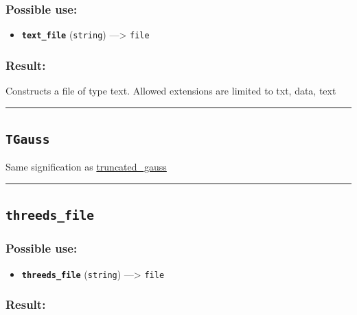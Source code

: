 \documentclass[]{book}
\providecommand{\tightlist}{%
  \setlength{\itemsep}{0pt}\setlength{\parskip}{0pt}}
\theoremstyle{definition}
\theoremstyle{definition}
\theoremstyle{definition}
\theoremstyle{remark}
\begin{document}
\subsubsection{Possible use:}\label{possible-use-517}

\begin{itemize}
\tightlist
\item
  \textbf{\texttt{text\_file}} (\texttt{string}) ---\textgreater{}
  \texttt{file}
\end{itemize}

\subsubsection{Result:}\label{result-500}

Constructs a file of type text. Allowed extensions are limited to txt,
data, text

\begin{center}\rule{0.5\linewidth}{\linethickness}\end{center}

\subsection{\texorpdfstring{\texttt{TGauss}}{TGauss}}\label{tgauss}

Same signification as
\href{operators-s-to-z.html\#truncated_gauss}{truncated\_gauss}

\begin{center}\rule{0.5\linewidth}{\linethickness}\end{center}

\subsection{\texorpdfstring{\texttt{threeds\_file}}{threeds\_file}}\label{threeds_file}

\subsubsection{Possible use:}\label{possible-use-518}

\begin{itemize}
\tightlist
\item
  \textbf{\texttt{threeds\_file}} (\texttt{string}) ---\textgreater{}
  \texttt{file}
\end{itemize}

\subsubsection{Result:}\label{result-501}
\end{document}
